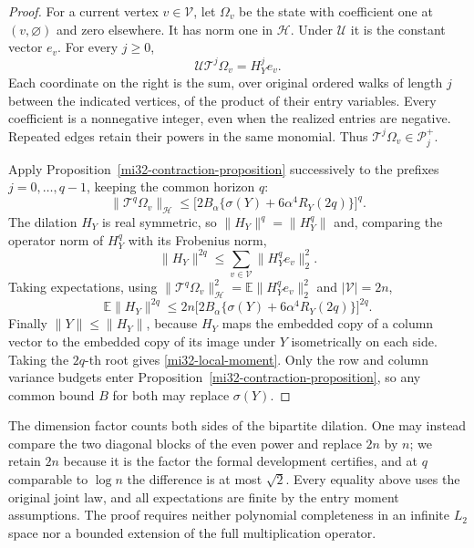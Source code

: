 \documentclass[11pt]{article}
\theoremstyle{definition}
\theoremstyle{remark}
\newcommand{\E}{\mathbb E}
\newcommand{\norm}[1]{\lVert#1\rVert}
\begin{document}
\begin{proof}
For a current vertex $v\in\mathcal V$, let $\Omega_v$ be the state
with coefficient one at $(v,\varnothing)$ and zero elsewhere. It has
norm one in $\mathcal H$. Under $\mathcal U$ it is the constant vector
$e_v$. For every $j\ge0$,
\[
 \mathcal U\mathcal T^j\Omega_v=H_Y^j e_v.
\]
Each coordinate on the right is the sum, over original ordered walks
of length $j$ between the indicated vertices, of the product of their
entry variables. Every coefficient is a nonnegative integer, even
when the realized entries are negative. Repeated edges retain their
powers in the same monomial. Thus
$\mathcal T^j\Omega_v\in\mathcal P_j^+$.

Apply Proposition~\ref{mi32-contraction-proposition} successively to
the prefixes $j=0,\ldots,q-1$, keeping the common horizon $q$:
\begin{equation}\label{mi32-vacuum-prefix}
 \norm{\mathcal T^q\Omega_v}_{\mathcal H}
 \le\bigl[2B_\alpha\{\sigma(Y)+6\alpha^4R_Y(2q)\}\bigr]^q .
\end{equation}
The dilation $H_Y$ is real symmetric, so $\norm{H_Y}^q=\norm{H_Y^q}$
and, comparing the operator norm of $H_Y^q$ with its Frobenius norm,
\begin{equation}\label{mi32-vacuum-trace}
 \norm{H_Y}^{2q}\le\sum_{v\in\mathcal V}\norm{H_Y^qe_v}_2^2 .
\end{equation}
Taking expectations, using
$\norm{\mathcal T^q\Omega_v}_{\mathcal H}^2
 =\E\norm{H_Y^qe_v}_2^2$ and $|\mathcal V|=2n$,
\[
 \E\norm{H_Y}^{2q}
 \le2n\bigl[2B_\alpha\{\sigma(Y)+6\alpha^4R_Y(2q)\}\bigr]^{2q}.
\]
Finally $\norm{Y}\le\norm{H_Y}$, because $H_Y$ maps the embedded copy
of a column vector to the embedded copy of its image under $Y$
isometrically on each side. Taking the $2q$-th root gives
\eqref{mi32-local-moment}. Only the row and column variance budgets
enter Proposition~\ref{mi32-contraction-proposition}, so any common
bound $B$ for both may replace $\sigma(Y)$.
\end{proof}

The dimension factor counts both sides of the bipartite dilation. One
may instead compare the two diagonal blocks of the even power and
replace $2n$ by $n$; we retain $2n$ because it is the factor the formal
development certifies, and at $q$ comparable to $\log n$ the difference
is at most $\sqrt2$. Every equality above uses the original joint law,
and all expectations are finite by the entry moment assumptions. The
proof requires neither polynomial completeness in an infinite $L_2$
space nor a bounded extension of the full multiplication operator.
\end{document}
